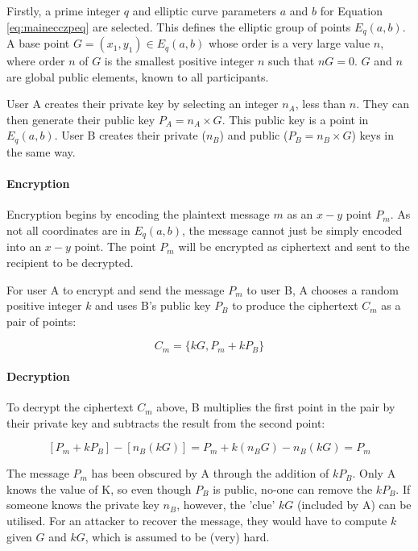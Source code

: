 \documentclass[a4paper,12pt]{report}
\begin{document}
Firstly, a prime integer $q$ and elliptic curve parameters $a$ and $b$ for Equation \ref{eq:mainecczpeq} are selected. This defines the elliptic group of points $E_{q}(a,b)$. A base point $G = (x_{1},y_{1}) \in E_{q}(a,b)$ whose order is a very large value $n$, where order $n$ of $G$ is the smallest positive integer $n$ such that $nG = 0$. $G$ and $n$ are global public elements, known to all participants. 

User A creates their private key by selecting an integer $n_{A}$, less than $n$. They can then generate their public key $P_{A} = n_{A} \times G$. This public key is a point in $E_{q}(a,b)$. User B creates their private ($n_{B}$) and public ($P_{B} = n_{B} \times G$) keys in the same way.

\paragraph{Encryption}

Encryption begins by encoding the plaintext message $m$ as an $x-y$ point $P_{m}$. As not all coordinates are in $E_{q}(a,b)$, the message cannot just be simply encoded into an $x-y$ point. The point $P_{m}$ will be encrypted as ciphertext and sent to the recipient to be decrypted. 

For user A to encrypt and send the message $P_{m}$ to user B, A chooses a random positive integer $k$ and uses B's public key $P_{B}$ to produce the ciphertext $C_{m}$ as a pair of points:

\[ C_{m} = \{kG , P_{m} + kP_{B}\} \]

\paragraph{Decryption}

To decrypt the ciphertext $C_{m}$ above, B multiplies the first point in the pair by their private key and subtracts the result from the second point:

\[ [P_{m} + kP_{B}] - [n_{B}(kG)] = P_{m} + k(n_{B}G) - n_{B}(kG) = P_{m} \]

The message $P_{m}$ has been obscured by A through the addition of $kP_{B}$. Only A knows the value of K, so even though $P_{B}$ is public, no-one can remove the $kP_{B}$. If someone knows the private key $n_{B}$, however, the 'clue' $kG$ (included by A) can be utilised. For an attacker to recover the message, they would have to compute $k$ given $G$ and $kG$, which is assumed to be (very) hard. 
\end{document}
